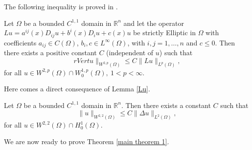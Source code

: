 \documentclass[reqno]{amsart}
\begin{document}
The following inequality is proved in \cite[Lemma 9.17]{DN}.

\begin{lemma} \label{Lu}
Let \(\Omega \) be a bounded \( C^{1,1 }\) domain in \(\mathbb{R}^n\) and let the
operator \(Lu = a^{ij}(x)D_{ij}u+b^i(x)D_iu+c(x)u\)
 be strictly Elliptic in \(\Omega \) with coefficients
 \( a_{ij} \in C(\Omega )\), \(b_i , c \in L^\infty(\Omega) \), with
 \(i, j = 1, \dots, n\) and \(c \leq 0\). Then there
 exists a positive constant \(C\) (independent of \(u\)) such that
\[
 rVert u \rVert_{ W^{2,p}(\Omega)}\leq C \rVert Lu \rVert_{ L^{p}(\Omega)},
\]
for all \(u \in  W^{2,p}(\Omega) \cap W_{0}^{1,p}(\Omega),\  1 < p < \infty\).
\end{lemma}

Here comes a direct consequence of Lemma \ref{Lu}.

\begin{corollary} \label{cor lap}
Let \(\Omega \) be a bounded \( C^{1,1 }\) domain in \(\mathbb{R}^n\).
Then there exists  a constant \(C\) such that
\[
\rVert u \rVert_{ W^{2,2}(\Omega)}\leq C \rVert \Delta u \rVert_{ L^2(\Omega)},
\]
for all \(u \in  W^{2,2}(\Omega) \cap H_0^1(\Omega)\).
\end{corollary}

We are now ready to prove Theorem \ref{main theorem 1}.
\end{document}

